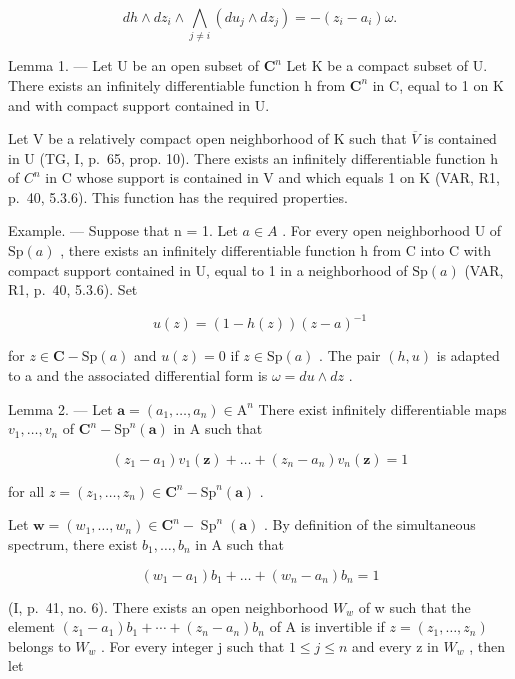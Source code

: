 \[
d h \wedge d z _ {i} \wedge \bigwedge_ {j \neq i} (d u _ {j} \wedge d z _ {j}) = - (z _ {i} - a _ {i}) \omega .\tag{3}
\]

Lemma 1. --- Let U be an open subset of \(\mathbf{C}^{n}\) Let K be a compact subset of U. There exists an infinitely differentiable function h from \(\mathbf{C}^{n}\) in C, equal to 1 on K and with compact support contained in U.

Let V be a relatively compact open neighborhood of K such that \(\overline{V}\) is contained in U (TG, I, p.~65, prop. 10). There exists an infinitely differentiable function h of \(C^{n}\) in C whose support is contained in V and which equals 1 on K (VAR, R1, p.~40, 5.3.6). This function has the required properties.

Example. --- Suppose that n = 1. Let \(a \in A\) . For every open neighborhood U of \(\mathrm{Sp}(a)\) , there exists an infinitely differentiable function h from C into C with compact support contained in U, equal to 1 in a neighborhood of \(\mathrm{Sp}(a)\) (VAR, R1, p.~40, 5.3.6). Set

\[
u (z) = (1 - h (z)) (z - a) ^ {- 1}
\]

for \(z \in \mathbf{C} - \mathrm{Sp}(a)\) and \(u(z) = 0\) if \(z \in \mathrm{Sp}(a)\) . The pair \((h, u)\) is adapted to a and the associated differential form is \(\omega = du \wedge dz\) .

Lemma 2. --- Let \(\boldsymbol{a} = (a_{1},\ldots ,a_{n})\in \mathrm{A}^{n}\) There exist infinitely differentiable maps \(v_{1},\ldots ,v_{n}\) of \(\mathbf{C}^n -\mathrm{Sp}^n (\boldsymbol {a})\) in A such that

\[
(z _ {1} - a _ {1}) v _ {1} (\boldsymbol {z}) + \dots + (z _ {n} - a _ {n}) v _ {n} (\boldsymbol {z}) = 1
\]

for all \(z = (z_{1}, \ldots, z_{n}) \in \mathbf{C}^{n} - \mathrm{Sp}^{n}(\boldsymbol{a})\) .

Let \(\boldsymbol{w} = (w_{1}, \ldots, w_{n}) \in \mathbf{C}^{n} - \operatorname{Sp}^{n}(\boldsymbol{a})\) . By definition of the simultaneous spectrum, there exist \(b_{1}, \ldots, b_{n}\) in A such that

\[
(w _ {1} - a _ {1}) b _ {1} + \dots + (w _ {n} - a _ {n}) b _ {n} = 1
\]

(I, p.~41, no. 6). There exists an open neighborhood \(W_{w}\) of w such that the element \((z_{1}-a_{1})b_{1}+\cdots+(z_{n}-a_{n})b_{n}\) of A is invertible if \(z=(z_{1},\ldots,z_{n})\) belongs to \(W_{w}\) . For every integer j such that \(1\leqslant j\leqslant n\) and every z in \(W_{w}\) , then let

